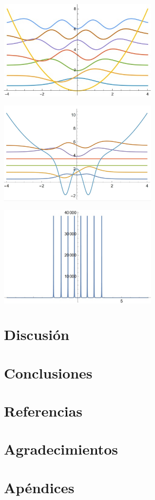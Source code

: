 \documentclass[%
 aip,
 jmp,%
 amsmath,amssymb,
 reprint,
]{revtex4-2}
\begin{document}
\begin{center}
    \includegraphics[width=0.6\textwidth]{QuantumHarmonicOscillator.jpeg} 
\end{center}
\begin{center}
    \includegraphics[width=0.6\textwidth]{QuantumHarmonicOscillator_2_3.jpeg} 
\end{center}
\begin{center}
    \includegraphics[width=0.6\textwidth]{QHO_Odd.jpeg} 
\end{center}

\section{Discusión}

\section{Conclusiones}

\nocite{*}
\maketitle
\section{Referencias}

\section{Agradecimientos}

\section{Apéndices}
\end{document}
